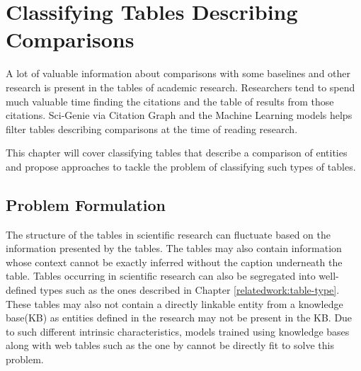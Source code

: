 \chapter{Classifying Tables Describing Comparisons}
\label{table_classification}
A lot of valuable information about comparisons with some baselines and other research is present in the tables of academic research. Researchers tend to spend much valuable time finding the citations and the table of results from those citations. Sci-Genie via Citation Graph and the Machine Learning models helps filter tables describing comparisons at the time of reading research. 

This chapter will cover classifying tables that describe a comparison of entities and propose approaches to tackle the problem of classifying such types of tables. 

\section{Problem Formulation}

The structure of the tables in scientific research can fluctuate based on the information presented by the tables. The tables may also contain information whose context cannot be exactly inferred without the caption underneath the table. Tables occurring in scientific research can also be segregated into well-defined types such as the ones described in Chapter \ref{relatedwork:table-type}. These tables may also not contain a directly linkable entity from a knowledge base(KB) as entities defined in the research may not be present in the KB. Due to such different intrinsic characteristics, models trained using knowledge bases along with web tables such as the one by \cite{deng2020turl} cannot be directly fit to solve this problem.


